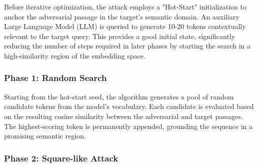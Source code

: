\documentclass[a4paper, sigconf]{acmart}
\begin{document}
Before iterative optimization, the attack employs a "Hot-Start" initialization to anchor the adversarial passage in the target's semantic domain. 
An auxiliary Large Language Model (LLM) is queried to generate 10-20 tokens contextually relevant to the target query. 
This provides a good initial state, significantly reducing the number of steps required in later phases by starting the search in a high-similarity region of the embedding space.


\subsubsection*{Phase 1: Random Search}


Starting from the hot-start seed, the algorithm generates a pool of random candidate tokens from the model's vocabulary. 
Each candidate is evaluated based on the resulting cosine similarity between the adversarial and target passages. 
The highest-scoring token is permanently appended, grounding the sequence in a promising semantic region.


\subsubsection*{Phase 2: Square-like Attack}

\end{document}
